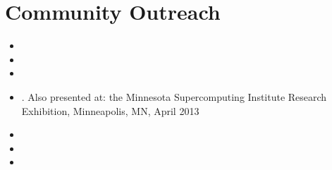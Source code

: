 \documentclass{report}
\begin{document}
\fi

\chapter{Community Outreach}

\begin{NoHyper}
\begin{itemize} 
        \item {}
        \item {}
        \item {}     
        \item {}. Also presented at: the Minnesota Supercomputing Institute Research Exhibition, Minneapolis, MN, April 2013
        \item {}
        \item {}              
        \item {}
\end{itemize}
\end{NoHyper}


\ifstandalone


\end{document}
